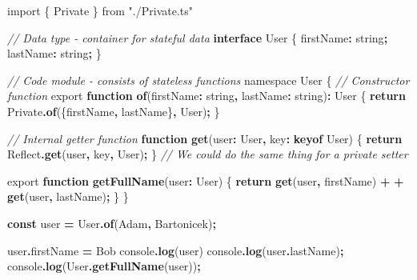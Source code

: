 \documentclass[
]{book}
\newenvironment{Shaded}{\begin{snugshade}}{\end{snugshade}}
\newcommand{\AttributeTok}[1]{\textcolor[rgb]{0.13,0.29,0.53}{#1}}
\newcommand{\BuiltInTok}[1]{#1}
\newcommand{\CommentTok}[1]{\textcolor[rgb]{0.56,0.35,0.01}{\textit{#1}}}
\newcommand{\ControlFlowTok}[1]{\textcolor[rgb]{0.13,0.29,0.53}{\textbf{#1}}}
\newcommand{\DataTypeTok}[1]{\textcolor[rgb]{0.13,0.29,0.53}{#1}}
\newcommand{\FunctionTok}[1]{\textcolor[rgb]{0.13,0.29,0.53}{\textbf{#1}}}
\newcommand{\ImportTok}[1]{#1}
\newcommand{\KeywordTok}[1]{\textcolor[rgb]{0.13,0.29,0.53}{\textbf{#1}}}
\newcommand{\NormalTok}[1]{#1}
\newcommand{\OperatorTok}[1]{\textcolor[rgb]{0.81,0.36,0.00}{\textbf{#1}}}
\newcommand{\StringTok}[1]{\textcolor[rgb]{0.31,0.60,0.02}{#1}}
\newcommand{\VerbatimStringTok}[1]{\textcolor[rgb]{0.31,0.60,0.02}{#1}}
\theoremstyle{definition}
\theoremstyle{definition}
\theoremstyle{definition}
\theoremstyle{definition}
\theoremstyle{remark}
\begin{document}
\begin{Shaded}
\begin{Highlighting}[]
\ImportTok{import}\NormalTok{ \{ Private \} }\ImportTok{from} \StringTok{"./Private.ts"}

\CommentTok{// Data type {-} container for stateful data}
\KeywordTok{interface}\NormalTok{ User \{}
\NormalTok{  firstName}\OperatorTok{:} \DataTypeTok{string}\OperatorTok{;}
\NormalTok{  lastName}\OperatorTok{:} \DataTypeTok{string}\OperatorTok{;}
\NormalTok{\}}

\CommentTok{// Code module {-} consists of stateless functions}
\ImportTok{namespace} \DataTypeTok{User}\NormalTok{ \{}
  \CommentTok{// Constructor function}
  \ImportTok{export} \KeywordTok{function} \KeywordTok{of}\NormalTok{(firstName}\OperatorTok{:} \DataTypeTok{string}\OperatorTok{,}\NormalTok{ lastName}\OperatorTok{:} \DataTypeTok{string}\NormalTok{)}\OperatorTok{:}\NormalTok{ User \{}
    \ControlFlowTok{return}\NormalTok{ Private}\OperatorTok{.}\FunctionTok{of}\NormalTok{(\{firstName}\OperatorTok{,}\NormalTok{ lastName\}}\OperatorTok{,}\NormalTok{ User)}\OperatorTok{;}
\NormalTok{  \}}
  
  \CommentTok{// Internal getter function}
  \KeywordTok{function} \KeywordTok{get}\NormalTok{(user}\OperatorTok{:}\NormalTok{ User}\OperatorTok{,}\NormalTok{ key}\OperatorTok{:} \KeywordTok{keyof}\NormalTok{ User) \{}
    \ControlFlowTok{return} \BuiltInTok{Reflect}\OperatorTok{.}\FunctionTok{get}\NormalTok{(user}\OperatorTok{,}\NormalTok{ key}\OperatorTok{,}\NormalTok{ User)}\OperatorTok{;}
\NormalTok{  \}}
  \CommentTok{// We could do the same thing for a private setter}
  
  \ImportTok{export} \KeywordTok{function} \FunctionTok{getFullName}\NormalTok{(user}\OperatorTok{:}\NormalTok{ User) \{}
    \ControlFlowTok{return} \KeywordTok{get}\NormalTok{(user}\OperatorTok{,} \VerbatimStringTok{\textasciigrave{}firstName\textasciigrave{}}\NormalTok{) }\OperatorTok{+} \VerbatimStringTok{\textasciigrave{} \textasciigrave{}} \OperatorTok{+} \KeywordTok{get}\NormalTok{(user}\OperatorTok{,} \VerbatimStringTok{\textasciigrave{}lastName\textasciigrave{}}\NormalTok{)}\OperatorTok{;}
\NormalTok{  \}}
\NormalTok{\}}

\KeywordTok{const}\NormalTok{ user }\OperatorTok{=}\NormalTok{ User}\OperatorTok{.}\FunctionTok{of}\NormalTok{(}\VerbatimStringTok{\textasciigrave{}Adam\textasciigrave{}}\OperatorTok{,} \VerbatimStringTok{\textasciigrave{}Bartonicek\textasciigrave{}}\NormalTok{)}\OperatorTok{;}

\NormalTok{user}\OperatorTok{.}\AttributeTok{firstName} \OperatorTok{=} \VerbatimStringTok{\textasciigrave{}Bob\textasciigrave{}}
\BuiltInTok{console}\OperatorTok{.}\FunctionTok{log}\NormalTok{(user)}
\BuiltInTok{console}\OperatorTok{.}\FunctionTok{log}\NormalTok{(user}\OperatorTok{.}\AttributeTok{lastName}\NormalTok{)}\OperatorTok{;}
\BuiltInTok{console}\OperatorTok{.}\FunctionTok{log}\NormalTok{(User}\OperatorTok{.}\FunctionTok{getFullName}\NormalTok{(user))}\OperatorTok{;}
\end{Highlighting}
\end{Shaded}
\end{document}
